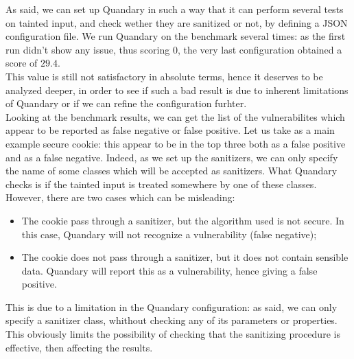 \documentclass[../Report.tex]{subfiles}
\begin{document}
As said, we can set up Quandary in such a way that it can perform several tests on tainted input, and check wether they are sanitized or not, by defining a JSON configuration file. We run Quandary on the benchmark several times: as the first run didn't show any issue, thus scoring 0, the very last configuration obtained a score of $29.4$. \\
This value is still not satisfactory in absolute terms, hence it deserves to be analyzed deeper, in order to see if such a bad result is due to inherent limitations of Quandary or if we can refine the configuration furhter. \\
Looking at the benchmark results, we can get the list of the vulnerabilites which appear to be reported as false negative or false positive. Let us take as a main example secure cookie: this appear to be in the top three both as a false positive and as a false negative. Indeed, as we set up the sanitizers, we can only specify the name of some classes which will be accepted as sanitizers. What Quandary checks is if the tainted input is treated somewhere by one of these classes. \\
However, there are two cases which can be misleading:
\begin{itemize}
	\item The cookie pass through a sanitizer, but the algorithm used is not secure. In this 
	case, Quandary will not recognize a vulnerability (false negative);
	\item The cookie does not pass through a sanitizer, but it does not contain sensible data.
	Quandary will report this as a vulnerability, hence giving a false positive.
\end{itemize}
This is due to a limitation in the Quandary configuration: as said, we can only specify a sanitizer class, whithout checking any of its parameters or properties. This obviously limits the possibility of checking that the sanitizing procedure is effective, then affecting the results.
\end{document}
